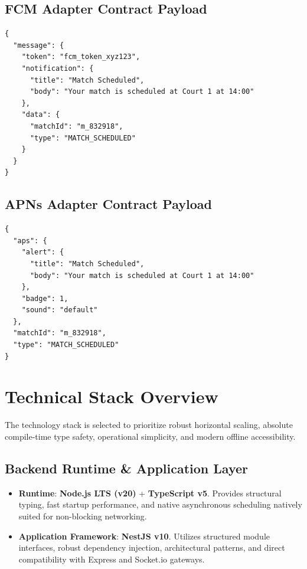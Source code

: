 \documentclass[11pt,a4paper]{report}
\begin{document}
\subsection{FCM Adapter Contract Payload}
\begin{lstlisting}[caption={FCM Adapter Contract Payload}]
{
  "message": {
    "token": "fcm_token_xyz123",
    "notification": {
      "title": "Match Scheduled",
      "body": "Your match is scheduled at Court 1 at 14:00"
    },
    "data": {
      "matchId": "m_832918",
      "type": "MATCH_SCHEDULED"
    }
  }
}
\end{lstlisting}

\subsection{APNs Adapter Contract Payload}
\begin{lstlisting}[caption={APNs Adapter Contract Payload}]
{
  "aps": {
    "alert": {
      "title": "Match Scheduled",
      "body": "Your match is scheduled at Court 1 at 14:00"
    },
    "badge": 1,
    "sound": "default"
  },
  "matchId": "m_832918",
  "type": "MATCH_SCHEDULED"
}
\end{lstlisting}


\section{Technical Stack Overview}


The technology stack is selected to prioritize robust horizontal scaling, absolute compile-time type safety, operational simplicity, and modern offline accessibility.

\subsection{Backend Runtime \& Application Layer}
\begin{itemize}
    \item \textbf{Runtime}: \textbf{Node.js LTS (v20)} + \textbf{TypeScript v5}. Provides structural typing, fast startup performance, and native asynchronous scheduling natively suited for non-blocking networking.
    \item \textbf{Application Framework}: \textbf{NestJS v10}. Utilizes structured module interfaces, robust dependency injection, architectural patterns, and direct compatibility with Express and Socket.io gateways.
\end{itemize}
\end{document}
